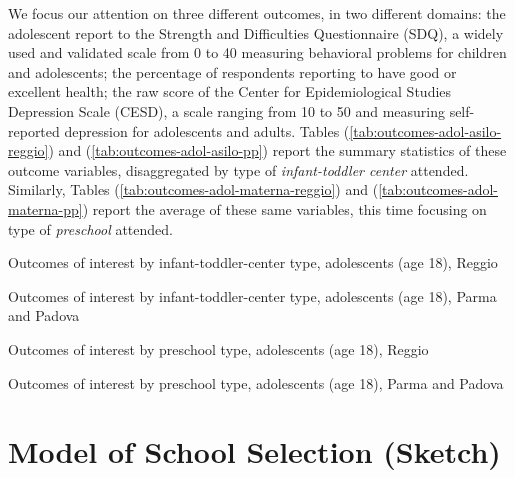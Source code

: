 \documentclass[12pt]{article}
\begin{document}
We focus our attention on three different outcomes, in two different domains: the adolescent report to the Strength and Difficulties Questionnaire (SDQ), a widely used and validated scale from 0 to 40 measuring behavioral problems for children and adolescents; the percentage of respondents reporting to have good or excellent health; the raw score of the Center for Epidemiological Studies Depression Scale (CESD), a scale ranging from 10 to 50 and measuring self-reported depression for adolescents and adults.%
Tables (\ref{tab:outcomes-adol-asilo-reggio}) and (\ref{tab:outcomes-adol-asilo-pp}) report the summary statistics of these outcome variables, disaggregated by type of \textit{infant-toddler center} attended. Similarly, Tables (\ref{tab:outcomes-adol-materna-reggio}) and (\ref{tab:outcomes-adol-materna-pp}) report the average of these same variables, this time focusing on type of \textit{preschool} attended. 

\begin{table}[H] 
\caption{Outcomes of interest by infant-toddler-center type, adolescents (age 18), Reggio}
\label{tab:outcomes-adol-asilo-reggio}

\end{table}

\begin{table}[H]
\caption{Outcomes of interest by infant-toddler-center type, adolescents (age 18), Parma and Padova}
\label{tab:outcomes-adol-asilo-pp}

\end{table}

\begin{table}[H] 
\caption{Outcomes of interest by preschool type, adolescents (age 18), Reggio}
\label{tab:outcomes-adol-materna-reggio}
  
\end{table}

\begin{table}[H] 
\caption{Outcomes of interest by preschool type, adolescents (age 18), Parma and Padova}
\label{tab:outcomes-adol-materna-pp}
  
\end{table}
%
\section{Model of School Selection (Sketch)}
\label{sec:model}

%
\end{document}
